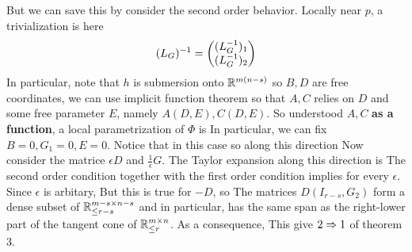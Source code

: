 \documentclass[]{note}
\begin{document}
But we can save this by consider the second order behavior. Locally near $p$, a trivialization is
here $$(L_G)^{-1}=\begin{pmatrix}(L_G^{-1})_1\\(L_G^{-1})_2\end{pmatrix}$$
In particular, note that $h$ is submersion onto $\mathbb{R}^{m(n-s)}$ so $B,D$ are free coordinates, we can use implicit function theorem so that $A,C$ relies on $D$ and some free parameter $E$, namely $A(D,E),C(D,E)$. So understood $A,C$ \textbf{as a function}, a local parametrization of $\Phi$ is 
In particular, we can fix $B=0,G_1=0,E=0$.
Notice that in this case so along this direction
Now consider the matrice ${\epsilon}D$ and $\frac1\epsilon G$. 
The Taylor expansion along this direction is
The second order condition together with the first order condition 
implies
for every $\epsilon$. Since $\epsilon$ is arbitary, 
But this is true for $-D$, so
The matrices $D(I_{r-s},G_2)$ form a dense subset of $\mathbb{R}_{\le r-s}^{m-s\times n-s}$ and 
in particular, 
has the same span as the right-lower part of the tangent cone of $\mathbb{R}_{\le r}^{m\times n}$. 
As a consequence, 
This give $2\Rightarrow 1$ of theorem 3.
\end{document}
